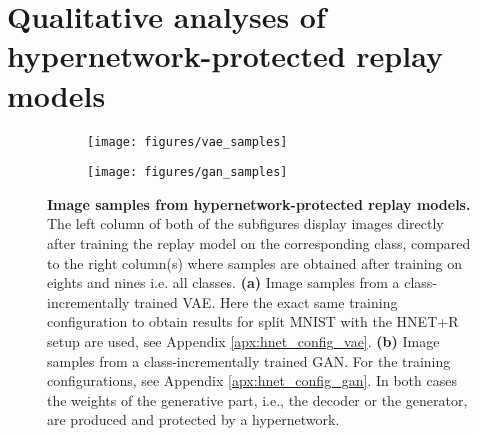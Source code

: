 \documentclass{article}
\begin{document}
\newpage

\section{Qualitative analyses of hypernetwork-protected replay models}
\label{apx:qualitative-replay-experiments}
\begin{figure}[htbp!]
    \centering
    \begin{subfigure}{0.49\linewidth}
    \caption{}
    \texttt{[image: figures/vae\_samples]}
    \end{subfigure}
    \begin{subfigure}{0.49\linewidth}
    \caption{}
    \texttt{[image: figures/gan\_samples]}
    \end{subfigure}
    \caption{\textbf{Image samples from hypernetwork-protected replay models.} The left column of both of the subfigures display images directly after training the replay model on the corresponding class, compared to the right column(s) where samples are obtained after training on eights and nines i.e. all classes. \textbf{(a)} Image samples from a class-incrementally trained VAE. Here the exact same training configuration to obtain results for split MNIST with the HNET+R setup are used, see Appendix \ref{apx:hnet_config_vae}. \textbf{(b)} Image samples from a class-incrementally trained GAN. For the training configurations, see Appendix \ref{apx:hnet_config_gan}. In both cases the weights of the generative part, i.e., the decoder or the generator, are produced and protected by a hypernetwork. \label{fig:generated-digits}
    }
\end{figure}
\end{document}
